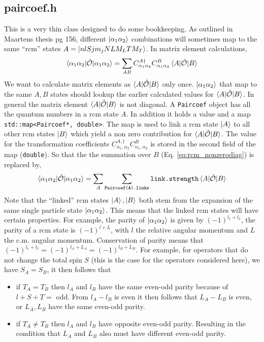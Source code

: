 \documentclass[10pt]{article}
\begin{document}
\subsection{paircoef.h}
\label{ssec:paircoef}
This is a very thin class designed to do some bookkeeping. As outlined in Maartens thesis pg 156, different $\ket{\alpha_1 \alpha_2}$ combinations will sometimes map to the same ``rcm'' states $A = \ket{ nlSjm_j NLM_L TM_T}$. In matrix element calculations,
\begin{align}
	\braket{\alpha_1 \alpha_2 | \hat{\mathcal{O}} | \alpha_1 \alpha_2} = \sum_{AB} C_{\alpha_1 \alpha_2}^{A \dagger} C_{\alpha_1 \alpha_2}^{B} \braket {A | \hat{\mathcal{O}} | B }
	\label{eq:rcm_nonzerodiag}
\end{align}
We want to calculate matrix elements as $\braket{ A | \hat{\mathcal{O}} | B}$ only once. $\ket{\alpha_1 \alpha_2}$ that map to the same $A,B$ states should lookup the earlier calculated values for $\braket{ A | \hat{\mathcal{O}} | B}$.
In general the matrix element $\braket{ A | \hat{\mathcal{O}} | B }$ is not diagonal. 
A \texttt{Paircoef} object has all the quantum numbers in a rcm state $A$. In addition it holds a value and a map \texttt{ std::map<Paircoef*, double>}. The map is used to link a rcm state $\ket{A}$ to all other rcm states $\ket{B}$ which yield a non zero contribution for $\braket{ A | \hat{\mathcal{O}} | B }$. The value for the transformation coefficients $C_{\alpha_1,\alpha_2}^{A,\dagger} C_{\alpha_1,\alpha_2}^{B}$ is stored in the second field of the map (\texttt{double}). So that the the summation over $B$ (Eq. \ref{eq:rcm_nonzerodiag}) is replaced by,
\begin{align}
	\braket{\alpha_1 \alpha_2 | \hat{\mathcal{O}} | \alpha_1 \alpha_2} = \sum_{A} \sum_{\texttt{Paircoef(A).links}}  \texttt{link.strength} \braket {A | \hat{\mathcal{O}} | B }
\end{align}
Note that the ``linked'' rcm states $\ket{A},\ket{B}$ both stem from the expansion of the same single particle state $\ket{ \alpha_1 \alpha_2}$.
This means that the linked rcm states will have certain properties.
For example, the parity of $\ket{ \alpha_1 \alpha_2}$ is given by $(-1)^{l_1 + l_2}$, the parity of a rcm state is $(-1)^{l+L}$, with $l$ the relative angular momentum and $L$ the c.m. angular momentum.
Conservation of parity means that $(-1)^{l_1 + l_2} = (-1)^{l_A + L_A} = (-1)^{l_B + L_B}$.
For example, for operators that do not change the total spin $S$ (this is the case for the operators considered here), we have $S_A = S_B$, it then follows that
\begin{itemize}
	\item if $T_A=T_B$ then $l_A$ and $l_B$ have the same even-odd parity because of $l+S+T=$ odd.
	From $l_A - l_B$ is even it then follows that $L_A - L_B$ is even, or $L_A,L_B$ have the same even-odd parity.
	\item if $T_A \neq T_B$ then $l_A$ and $l_B$ have opposite even-odd parity. Resulting in the condition that $L_A$ and $L_B$ also must have different even-odd parity. 
\end{itemize}
\end{document}
